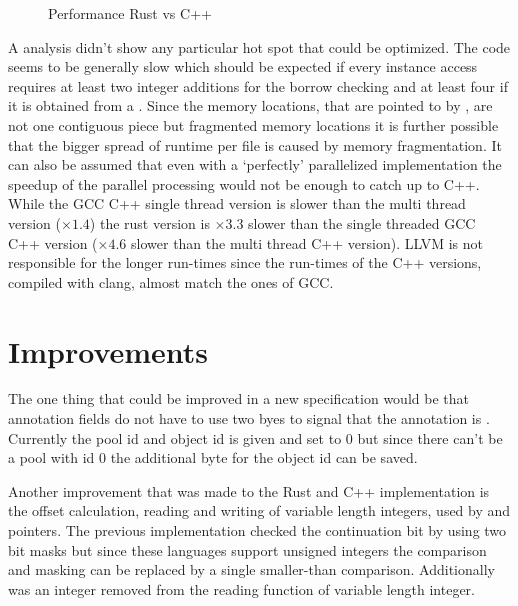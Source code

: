 \documentclass[thesis]{subfiles}
\begin{document}
  \begin{figure}[ht]
    \centering
    

    \hspace*{.55em}
    \hfill
    

    
    \caption{Performance Rust vs C++}\label{fig:bench}
  \end{figure}

  A  analysis didn't show any particular hot spot that could be optimized.
  The code seems to be generally slow which should be expected if every \PtrT instance access requires at least two integer additions for the borrow checking and at least four if it is obtained from a \UserTypePool.
  Since the memory locations, that are pointed to by \PtrT, are not one contiguous piece but fragmented memory locations it is further possible that the bigger spread of runtime per file is caused by memory fragmentation.
  It can also be assumed that even with a `perfectly' parallelized implementation the speedup of the parallel processing would not be enough to catch up to C++.
  While the GCC C++ single thread version is slower than the multi thread version ($\times 1.4$) the rust version is $\times 3.3$ slower than the single threaded GCC C++ version ($\times 4.6$ slower than the multi thread C++ version).
  LLVM is not responsible for the longer run-times since the run-times of the C++ versions, compiled with clang, almost match the ones of GCC.

\section{ Improvements}
  The one thing that could be improved in a new specification would be that annotation fields do not have to use two byes to signal that the annotation is .
  Currently the pool id and object id is given and set to 0 but since there can't be a pool with id 0 the additional byte for the object id can be saved.

  Another improvement that was made to the Rust and C++ implementation is the offset calculation, reading and writing of variable length integers, used by  and pointers.
  The previous implementation checked the continuation bit by using two bit masks but since these languages support unsigned integers the comparison and masking can be replaced by a single smaller-than comparison.
  Additionally was an integer removed from the reading function of variable length integer.
\end{document}
